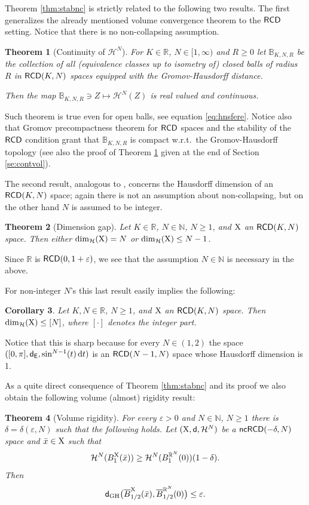 \documentclass[reqno,11pt]{article}
\numberwithin{equation}{section}
\newcommand{\N}{\mathbb{N}}
\newcommand{\R}{\mathbb{R}}
\newcommand{\sfd}{{\sf d}}
\renewcommand{\d}{{\mathrm d}}
\newcommand{\eps}{\varepsilon}
\newtheorem{theorem}{Theorem}[section]
\newtheorem{corollary}[theorem]{Corollary}
\newcommand{\X}{{\rm X}}
\newcommand{\RCD}{{\sf RCD}}
\newcommand{\ncRCD}{{\sf ncRCD}}
\newcommand{\Eu}{{\sf E}}
\newcommand{\HH}{{\mathcal H}}
\begin{document}
Theorem \ref{thm:stabnc} is strictly related to  the following two results. The first generalizes the already mentioned volume convergence theorem to the $\RCD$ setting. Notice that there is no non-collapsing assumption.
\begin{theorem}[Continuity of $\HH^N$]\label{thm:contvol}
For  $K\in\R$,  $N\in[1,\infty)$ and $R\geq 0$ let $\mathbb B_{K,N,R}$ be the collection of all (equivalence classes up to isometry of) closed  balls of radius $R$ in $\RCD(K,N)$ spaces equipped with the Gromov-Hausdorff distance.

Then the map ${\mathbb B}_{K,N,R}\ni Z\mapsto \HH^N(Z)$ is real valued and continuous.
\end{theorem}
Such theorem is true  even for open balls, see equation \eqref{eq:hnsfere}. Notice also that Gromov precompactness theorem for $\RCD$ spaces and the stability of the $\RCD$ condition grant that $\mathbb B_{K,N,R}$ is compact w.r.t.\ the Gromov-Hausdorff topology (see also the proof of Theorem \ref{thm:contvol} given at the end of Section \ref{se:contvol}).



The second result, analogous to \cite[Theorem 3.1]{Cheeger-Colding97I}, concerns the Hausdorff dimension of an $\RCD(K,N)$ space;  again there is not an assumption about non-collapsing, but on the other hand $N$ is assumed to be integer.
\begin{theorem}[Dimension gap]\label{thm:dimgap}
Let $K\in\R$, $N\in\N$, $N\geq1$, and $\X$ an $\RCD(K,N)$ space. Then either  $\dim_\HH(\X)=N$ or $\dim_\HH(\X)\leq N-1$.
\end{theorem}
Since $\R$ is $\RCD(0,1+\eps)$, we see that  the assumption $N\in\N$ is necessary in the above. { For non-integer $N$'s this last result easily implies the following:
\begin{corollary}\label{cor:ref}
Let $K,N\in\R$, $N\geq1$, and $\X$ an $\RCD(K,N)$ space. Then $\dim_{\HH}(\X)\leq [N]$, where $[\cdot]$ denotes the integer part.
\end{corollary}
Notice that this is sharp because for every $N\in(1,2)$ the space $([0,\pi],\sfd_\Eu,\sin^{N-1}(t)\,\d t)$ is an $\RCD(N-1,N)$ space whose Hausdorff dimension is 1.
}

As a quite direct consequence of Theorem \ref{thm:stabnc} and its proof we also obtain the following volume (almost) rigidity result:
\begin{theorem}[Volume rigidity]\label{thm:volrig}
For every $\eps>0$ and $N\in\N$, $N\geq 1$ there is $\delta=\delta(\eps,N)$ such that the following holds. Let $(\X,\sfd,\HH^N)$ be a $\ncRCD(-\delta,N)$ space and $\bar x\in\X$ such that
\[
\HH^N(B^\X_1(\bar x))\geq \HH^N(B_1^{\R^N}(0))(1-\delta).
\]
Then
\[
\sfd_{\rm GH}\big(\overline B_{1/2}^{\X}(\bar x),\overline B_{1/2}^{\R^N}(0)\big)\leq\eps.
\]
\end{theorem}
\end{document}

